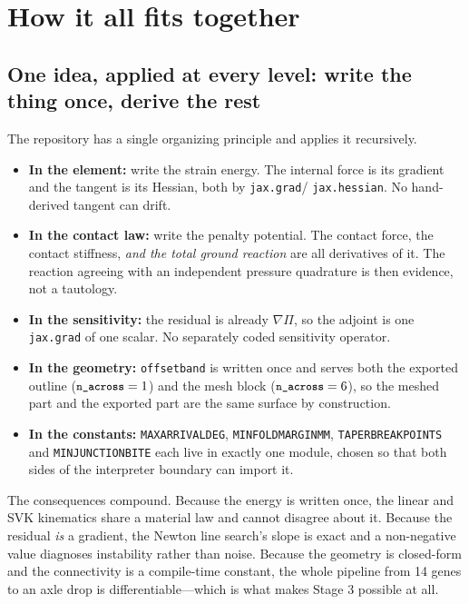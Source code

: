 \documentclass[11pt,a4paper]{article}
\DeclareRobustCommand{\code}[1]{%
  \texttt{\small\def\_{\textunderscore\discretionary{}{}{}}#1}}
\begin{document}
\section{How it all fits together}
\label{sec:synthesis}

\subsection{One idea, applied at every level: write the thing once, derive the rest}

The repository has a single organizing principle and applies it recursively.

\begin{itemize}
\item \textbf{In the element:} write the strain energy. The internal force is its
  gradient and the tangent is its Hessian, both by \code{jax.grad}/\code{jax.hessian}.
  No hand-derived tangent can drift.
\item \textbf{In the contact law:} write the penalty potential. The contact force, the
  contact stiffness, \emph{and the total ground reaction} are all derivatives of it. The
  reaction agreeing with an independent pressure quadrature is then evidence, not a
  tautology.
\item \textbf{In the sensitivity:} the residual is already $\nabla\Pi$, so the adjoint
  is one \code{jax.grad} of one scalar. No separately coded sensitivity operator.
\item \textbf{In the geometry:} \code{offset\_band} is written once and serves both the
  exported outline ($\code{n\_across} = 1$) and the mesh block
  ($\code{n\_across} = 6$), so the meshed part and the exported part are the same
  surface by construction.
\item \textbf{In the constants:} \code{MAX\_ARRIVAL\_DEG}, \code{MIN\_FOLD\_MARGIN\_MM},
  \code{TAPER\_BREAKPOINTS} and \code{MIN\_JUNCTION\_BITE} each live in exactly one
  module, chosen so that both sides of the interpreter boundary can import it.
\end{itemize}

The consequences compound. Because the energy is written once, the linear and SVK
kinematics share a material law and cannot disagree about it. Because the residual
\emph{is} a gradient, the Newton line search's slope is exact and a non-negative value
diagnoses instability rather than noise. Because the geometry is closed-form and the
connectivity is a compile-time constant, the whole pipeline from 14 genes to an axle
drop is differentiable---which is what makes Stage 3 possible at all.
\end{document}
